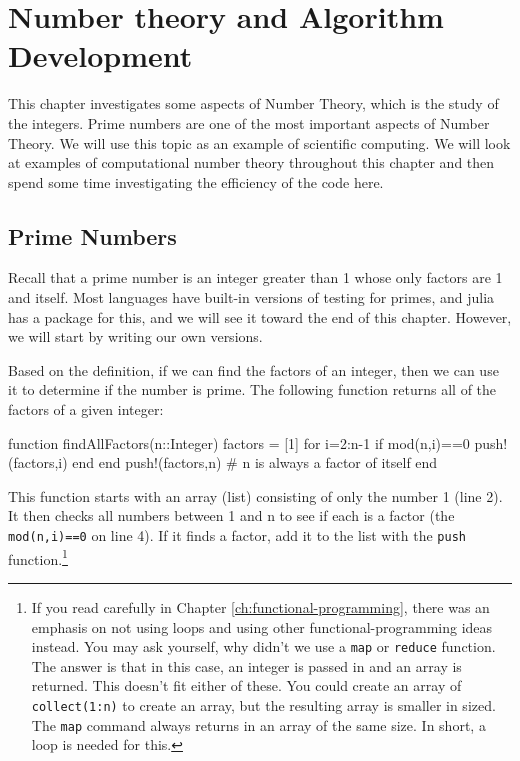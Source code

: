 
\hypertarget{ch:number-theory}{%
\chapter{Number theory and Algorithm Development}\label{ch:number-theory}}


This chapter investigates some aspects of Number Theory, which is the study of the integers. Prime numbers are one of the most important aspects of Number Theory. We will use this topic as an example of scientific computing. We will look at examples of computational number theory throughout this chapter and then spend some time investigating the efficiency of the code here.

\hypertarget{prime-numbers}{%
\section{Prime Numbers}\label{prime-numbers}}

Recall that a prime number is an integer greater than 1 whose only factors are 1 and itself. Most languages have built-in versions of testing for primes, and julia has a package for this, and we will see it toward the end of this chapter.  However, we will start by writing our own versions.

Based on the definition, if we can find the factors of an integer, then we can use it to determine if the number is prime.  The following function returns all of the factors of a given integer:
%
\begin{jlblock}[nt][numbers=left]
function findAllFactors(n::Integer)
  factors = [1]
  for i=2:n-1
    if mod(n,i)==0
      push!(factors,i)
    end
  end
  push!(factors,n) # n is always a factor of itself
end
\end{jlblock}

This function starts with an array (list) consisting of only the number 1 (line 2). It then checks all numbers between 1 and n to see if each is a factor (the \verb!mod(n,i)==0! on line 4). If it finds a factor, add it to the list with the \texttt{push} function.\footnote{If you read carefully in Chapter \ref{ch:functional-programming}, there was an emphasis on not using loops and using other functional-programming ideas instead.  You may ask yourself, why didn't we use a \texttt{map} or \texttt{reduce} function. The answer is that in this case, an integer is passed in and an array is returned.  This doesn't fit either of these.  You could create an array of \texttt{collect(1:n)} to create an array, but the resulting array is smaller in sized.  The \texttt{map} command always returns in an array of the same size.  In short, a loop is needed for this.}


